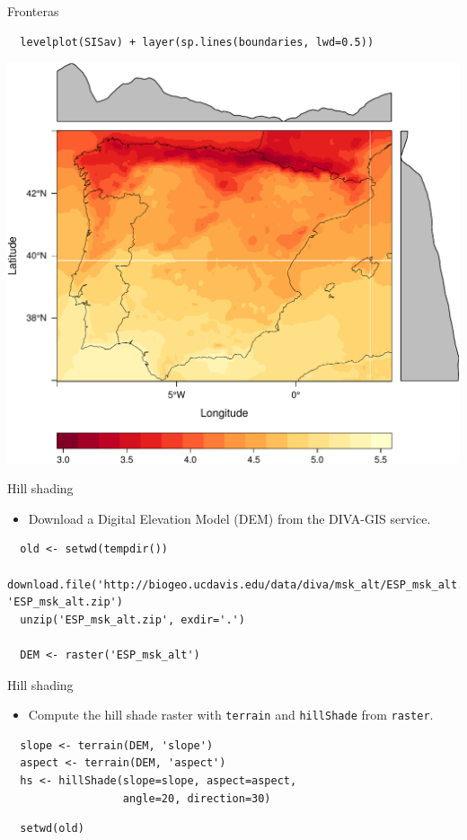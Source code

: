 \documentclass[xcolor={usenames,svgnames,dvipsnames}]{beamer}
\begin{document}
\begin{frame}[fragile,label=sec-2-4]{Fronteras}
 \lstset{language=R,label= ,caption= ,numbers=none}
\begin{lstlisting}
  levelplot(SISav) + layer(sp.lines(boundaries, lwd=0.5))
\end{lstlisting}

\includegraphics[width=.9\linewidth]{figs/leveplotSISavBoundaries.pdf}
\end{frame}

\begin{frame}[fragile,label=sec-2-5]{Hill shading}
 \begin{itemize}
\item Download a Digital Elevation Model (DEM) from the DIVA-GIS service.
\end{itemize}

\lstset{language=R,label= ,caption= ,numbers=none}
\begin{lstlisting}
  old <- setwd(tempdir())
  download.file('http://biogeo.ucdavis.edu/data/diva/msk_alt/ESP_msk_alt.zip, 'ESP_msk_alt.zip')
  unzip('ESP_msk_alt.zip', exdir='.')
  
  DEM <- raster('ESP_msk_alt')
\end{lstlisting}
\end{frame}

\begin{frame}[fragile,label=sec-2-6]{Hill shading}
 \begin{itemize}
\item Compute the hill shade raster with \texttt{terrain} and \texttt{hillShade} from \texttt{raster}.
\end{itemize}

\lstset{language=R,label= ,caption= ,numbers=none}
\begin{lstlisting}
  slope <- terrain(DEM, 'slope')
  aspect <- terrain(DEM, 'aspect')
  hs <- hillShade(slope=slope, aspect=aspect,
                  angle=20, direction=30)
\end{lstlisting}

\lstset{language=R,label= ,caption= ,numbers=none}
\begin{lstlisting}
  setwd(old)
\end{lstlisting}
\end{frame}
\end{document}
